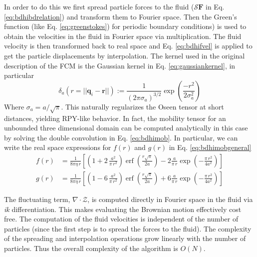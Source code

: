 \documentclass[twoside,openright,titlepage,numbers=noenddot,%
headinclude,footinclude,cleardoublepage=empty,abstract=on,
BCOR=5mm,fontsize=11pt, dvipsnames, paper=b5
]{scrreprt}
\renewcommand{\vec}[1]{\bm{#1}}
\newcommand{\oper}[1]{\mathcal{#1}}
\DeclareMathOperator{\erf}{erf}
\newcommand{\ppos}{q}
\newcommand{\fpos}{r}
\begin{document}
In order to do this we first spread particle forces to the fluid ($\oper{S}\vec{F}$ in Eq. \eqref{eq:bdhibdrelation}) and transform them to Fourier space. Then the Green's function (like Eq. \eqref{eq:greenstokes}) for periodic boundary conditions) is used to obtain the velocities in the fluid in Fourier space via multiplication. The fluid velocity is then transformed back to real space and Eq. \eqref{eq:bdhifvel} is applied to get the particle displacements by interpolation.
The kernel used in the original description of the \gls{FCM} is the Gaussian kernel in Eq. \eqref{eq:gaussiankernel}, in particular
\begin{equation}
  \label{eq:fcmkernel}
  \delta_a(r = ||\vec{\ppos}_i - \vec{\fpos}||) := \frac{1}{(2\pi\sigma_a)^{3/2}}\exp\left(\frac{-r^2}{2\sigma_a^2}\right)
\end{equation}
Where $\sigma_a = a/\sqrt{\pi}$. This naturally regularizes the Oseen tensor at short distances, yielding \gls{RPY}-like behavior. In fact, the mobility tensor for an unbounded three dimensional domain can be computed analytically in this case by solving the double convolution in Eq. \eqref{eq:bdhimob}. In particular, we can write the real space expressions for $f(r)$ and $g(r)$ in Eq. \eqref{eq:bdhimobgeneral}
\begin{equation}
  \label{eq:fcmmob}
  \begin{aligned}
f(r) & =  \frac{1}{8\pi\eta\,r}\left[\left(1+2\,\frac{a^{2}}{\pi\,r^{2}}\right){\erf}\left(\frac{r\sqrt{\pi}}{2a}\right)-2\frac{a}{\pi\,r}\exp\left(-\frac{\pi\,r^{2}}{4a^{2}}\right)\right]\\
g(r) & =  \frac{1}{8\pi\eta\,r}\left[\left(1-6\,\frac{a^{2}}{\pi\,r^{2}}\right){\erf}\left(\frac{r\sqrt{\pi}}{2a}\right)+6\frac{a}{\pi\,r}\exp\left(-\frac{\pi\,r^{2}}{4a^{2}}\right)\right]
  \end{aligned}
\end{equation}

The fluctuating term, $\nabla\cdot\mathcal{Z}$, is computed directly in Fourier space in the fluid via \emph{ik} differentiation. This makes evaluating the Brownian motion effectively cost free.
The computation of the fluid velocities is independent of the number of particles (since the first step is to spread the forces to the fluid). The complexity of the spreading and interpolation operations grow linearly with the number of particles. Thus the overall complexity of the algorithm is $O(N)$.
\end{document}
